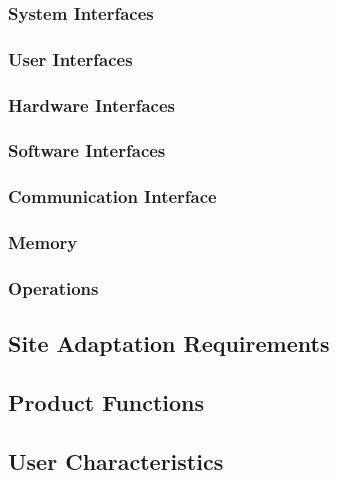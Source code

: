 \documentclass[a4paper,12pt]{article}
\begin{document}
        	\subsubsection{System Interfaces}
        	
            \subsubsection{User Interfaces}
            
            \subsubsection{Hardware Interfaces}
            
            \subsubsection{Software Interfaces}
            
            \subsubsection{Communication Interface}
            
            \subsubsection{Memory}
            
            \subsubsection{Operations}
            
            \subsection{Site Adaptation Requirements}
            
        \subsection{Product Functions}
        
        \subsection{User Characteristics}
        
\end{document}
